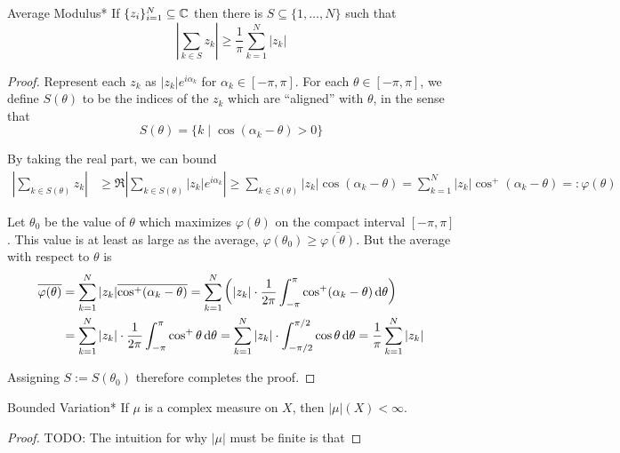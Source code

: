 \begin{lemma}{Average Modulus}*
    If $\{z_i\}_{i=1}^N \subseteq \mathbb{C}$ then there is $S \subseteq \{1, \dots, N\}$ such that 
    $$
        \left| \sum_{k \in S} z_k \right| \geq \frac{1}{\pi} \sum_{k=1}^N |z_k|
    $$
\end{lemma}

\begin{proof}
    Represent each $z_k$ as $|z_k| e^{i\alpha_k}$ for $\alpha_k \in [-\pi, \pi]$. For each $\theta \in [-\pi, \pi]$, we define $S(\theta)$ to be the indices of the $z_k$ which are ``aligned'' with $\theta$, in the sense that 
    $$
        S(\theta) = \{k \mid \cos(\alpha_k - \theta) > 0\}
    $$

    By taking the real part, we can bound
    \begin{align*}
        \left| \sum_{k \in S(\theta)} z_k \right| 
        &\geq \Re \left| \sum_{k \in S(\theta)} |z_k| e^{i \alpha_k} \right|
        \geq \sum_{k \in S(\theta)} |z_k| \cos(\alpha_k - \theta)
        = \sum_{k=1}^N |z_k| \cos^+(\alpha_k - \theta)
        =: \varphi(\theta)
    \end{align*}

    Let $\theta_0$ be the value of $\theta$ which maximizes $\varphi(\theta)$ on the compact interval $[-\pi, \pi]$. This value is at least as large as the average, $\varphi(\theta_0) \geq \overline{\varphi(\theta)}$. But the average with respect to $\theta$ is 
    \begin{align*}
        \overline{\varphi(\theta)} 
        &= \sum_{k=1}^N |z_k| \overline{\cos^+(\alpha_k - \theta)}
        = \sum_{k=1}^N \left( |z_k| \cdot \frac{1}{2\pi} \int_{-\pi}^\pi \cos^+(\alpha_k - \theta) \, \mathrm{d}\theta \right) \\
        &= \sum_{k=1}^N |z_k| \cdot \frac{1}{2\pi} \int_{-\pi}^\pi \cos^+\theta \, \mathrm{d}\theta
        = \sum_{k=1}^N |z_k| \cdot \int_{-\pi/2}^{\pi/2} \cos\theta \, \mathrm{d}\theta
        = \frac{1}{\pi} \sum_{k=1}^N |z_k| 
    \end{align*}

    Assigning $S := S(\theta_0)$ therefore completes the proof. 
\end{proof}

\begin{theorem}{Bounded Variation}*
    If $\mu$ is a complex measure on $X$, then $|\mu|(X) < \infty$.
\end{theorem}

\begin{proof}
    TODO: The intuition for why $|\mu|$ must be finite is that 
\end{proof}

